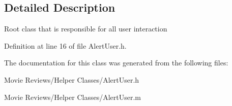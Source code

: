 \subsection{Detailed Description}
Root class that is responsible for all user interaction 

Definition at line 16 of file Alert\+User.\+h.



The documentation for this class was generated from the following files\+:\begin{DoxyCompactItemize}
\item 
Movie Reviews/\+Helper Classes/Alert\+User.\+h\item 
Movie Reviews/\+Helper Classes/Alert\+User.\+m\end{DoxyCompactItemize}
